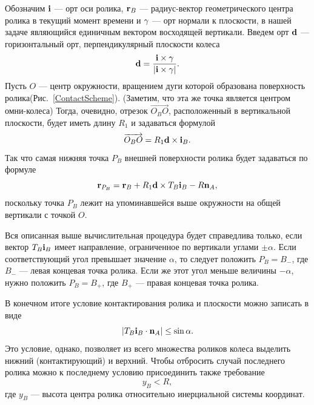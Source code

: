 Обозначим ${\bf i}$ --- орт оси ролика,
${\bf r}_B$ ---
радиус-вектор геометрического центра ролика в текущий момент времени и 
${\bf \gamma}$ --- орт нормали к плоскости,  в нашей задаче являющийся единичным вектором восходящей вертикали. 
Введем орт ${\bf d}$ --- горизонтальный орт, перпендикулярный плоскости колеса
$$
{\bf d}=\dfrac{{\bf i}\times {\bf \gamma}}
              {\left| {\bf i}\times {\bf \gamma}\right|}.
$$
Пусть $O$ --- центр окружности, вращением дуги которой образована поверхность ролика(Рис.~\ref{ContactScheme}). (Заметим, что эта же точка является центром омни-колеса)  
Тогда, очевидно, отрезок $\overrightarrow{O_BO}$, расположенный в вертикальной
плоскости, будет иметь длину $R_1$ и задаваться формулой
$$
\overrightarrow{O_BO}=R_1{\bf d}\times {\bf i}_B.
$$
 Так что самая нижняя точка $P_B$ внешней 
поверхности ролика будет задаваться по формуле
\begin{equation}
{\bf r}_{P_B}={\bf r}_B+R_1{\bf d}\times T_B{\bf i}_B-R{\bf n}_A,
\label{3_2_0}
\end{equation}
поскольку точка $P_B$ лежит на упоминавшейся выше окружности на общей вертикали 
с точкой $O$. 


Вся описанная выше вычислительная процедура будет справедлива только, если 
вектор $T_B{\bf i}_B$ имеет направление, ограниченное по вертикали углами
$\pm\alpha $. 
Если соответствующий угол превышает значение $\alpha$, то 
следует положить $P_B=B_{-}$, где $B_{-}$ --- левая концевая точка ролика. Если
же этот угол меньше величины $-\alpha $, нужно положить $P_B=B_{+}$, где 
$B_{+}$ --- правая концевая точка ролика.

В конечном итоге условие контактирования ролика и плоскости можно записать в 
виде
\begin{equation}
\left| T_B{\bf i}_B\cdot {\bf n}_A\right|\le\sin\alpha .
\label{3_2}
\end{equation}
Это условие, однако, позволяет из всего множества роликов колеса выделить 
нижний (контактирующий) и верхний. Чтобы отбросить случай последнего ролика
можно к последнему условию присоединить также требование 
\begin{equation}
y_B<R,
\label{3_3}
\end{equation}
где $y_B$ --- высота центра ролика относительно инерциальной системы координат.

